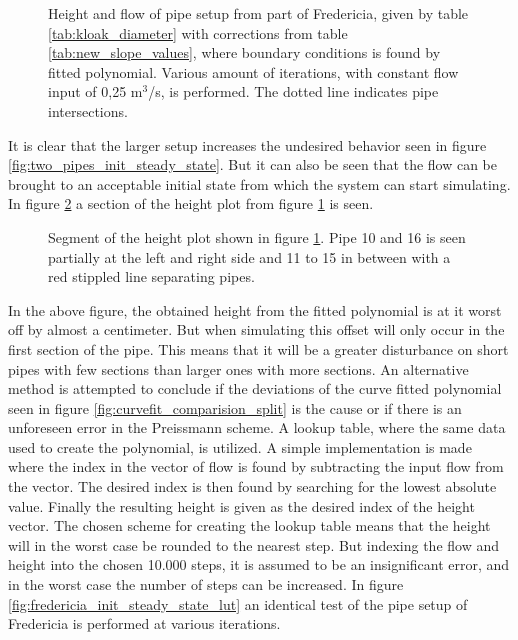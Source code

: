 \begin{figure}[H]
 \centering
 
\caption{Height and flow of pipe setup from part of Fredericia, given by table \ref{tab:kloak_diameter} with corrections from table \ref{tab:new_slope_values}, where boundary conditions is found by fitted polynomial. Various amount of iterations, with constant flow input of 0,25 $\text{m}^\text{3}$/s, is performed. The dotted line indicates pipe intersections.}
\label{fig:fredericia_init_steady_state}
\end{figure}

It is clear that the larger setup increases the undesired behavior seen in figure \ref{fig:two_pipes_init_steady_state}. But it can also be seen that the flow can be brought to an acceptable initial state from which the system can start simulating. In figure \ref{fig:fredericia_init_steady_state_zoom} a section of the height plot from figure \ref{fig:fredericia_init_steady_state} is seen. 

\begin{figure}[H]
 \centering
 
\caption{Segment of the height plot shown in figure \ref{fig:fredericia_init_steady_state}. Pipe 10 and 16 is seen partially at the left and right side and 11 to 15 in between with a red stippled line separating pipes.}
\label{fig:fredericia_init_steady_state_zoom}
\end{figure}
In the above figure, the obtained height from the fitted polynomial is at it worst off by almost a centimeter. But when simulating this offset will only occur in the first section of the pipe. This means that it will be a greater disturbance on short pipes with few sections than larger ones with more sections. An alternative method is attempted to conclude if the deviations of the curve fitted polynomial seen in figure \ref{fig:curvefit_comparision_split} is the cause or if there is an unforeseen error in the Preissmann scheme. A lookup table, where the same data used to create the polynomial, is utilized. A simple implementation is made where the index in the vector of flow is found by subtracting the input flow from the vector. The desired index is then found by searching for the lowest absolute value. Finally the resulting height is given as the desired index of the height vector. The chosen scheme for creating the lookup table means that the height will in the worst case be rounded to the nearest step. But indexing the flow and height into the chosen 10.000 steps, it is assumed to be an insignificant error, and in the worst case the number of steps can be increased. In figure \ref{fig:fredericia_init_steady_state_lut} an identical test of the pipe setup of Fredericia is performed at various iterations.      

